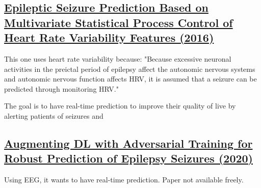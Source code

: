 \subsection{\href{https://ieeexplore.ieee.org/abstract/document/7365453}{Epileptic Seizure Prediction Based on Multivariate Statistical Process Control of Heart Rate Variability Features (2016)}}

This one uses heart rate variability because: "Because excessive neuronal activities in the preictal period of epilepsy affect the autonomic nervous systems and autonomic nervous function affects HRV, it is assumed that a seizure can be predicted through monitoring HRV."

The goal is to have real-time prediction to improve their quality of live by alerting patients of seizures and 

\subsection{\href{https://dl.acm.org/doi/abs/10.1145/3386580}{Augmenting DL with Adversarial Training for Robust Prediction of Epilepsy Seizures (2020)}}

Using EEG, it wants to have real-time prediction. Paper not available freely.
